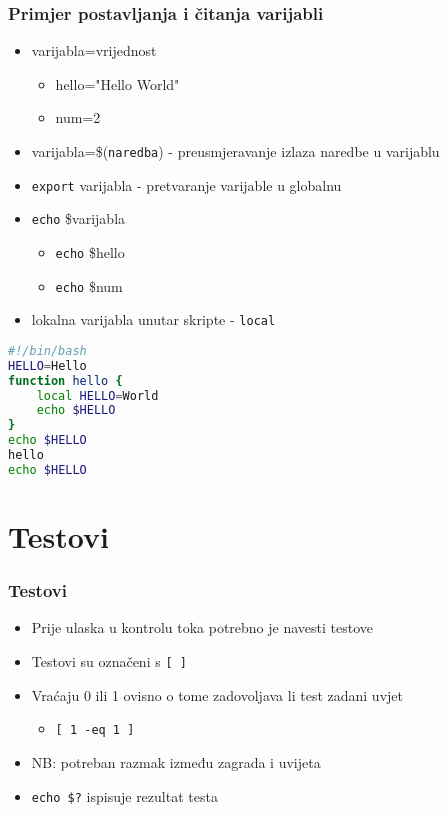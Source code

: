 \documentclass{beamer}
\newcommand{\shell}[1]{\texttt{#1}}
\begin{document}
\begin{frame}[t]
\frametitle{Primjer postavljanja i čitanja varijabli}
\begin{itemize}
	\item varijabla=vrijednost
		 \begin{itemize}
		 	\item hello="Hello World"
		 	\item num=2
		 \end{itemize}
	 \item varijabla=\$(\shell{naredba}) - preusmjeravanje izlaza naredbe u varijablu
	 \item \shell{export} varijabla - pretvaranje varijable u globalnu
	 \item \shell{echo} \$varijabla
	 	\begin{itemize}
	 		\item \shell{echo}  \$hello
	 		\item \shell{echo}  \$num
	 	\end{itemize}
 	\item lokalna varijabla unutar skripte - \shell{local}
 	
\end{itemize}

\end{frame}
\begin{lstlisting}[language=bash,caption={Primjer uporabe lokalne varijable}]
#!/bin/bash
HELLO=Hello 
function hello {
	local HELLO=World
	echo $HELLO
}
echo $HELLO
hello
echo $HELLO
\end{lstlisting}
\section{Testovi}
\begin{frame}
\frametitle{Testovi}
\begin{itemize}
	\item Prije ulaska u kontrolu toka potrebno je navesti testove
	\item Testovi su označeni s \shell{[ ]}
	\item Vraćaju 0 ili 1 ovisno o tome zadovoljava li test zadani uvjet
	\begin{itemize}
		\item \shell{[ 1 -eq 1 ]}
	\end{itemize}
	\item NB: potreban razmak između zagrada i uvijeta
	\item \shell{echo \$?} ispisuje rezultat testa
\end{itemize}
\end{frame}
\end{document}
